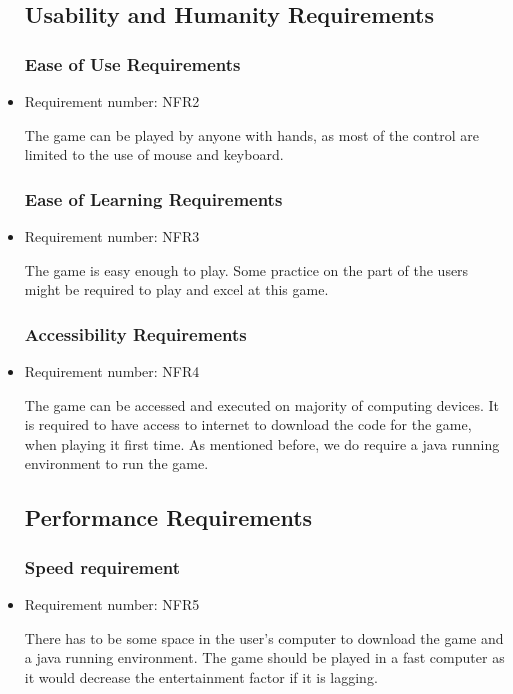 \documentclass[12pt,letterpaper]{article}
\begin{document}
\begin{itemize}
	\subsection{Usability and Humanity Requirements}
	\subsubsection{Ease of Use Requirements}
	
	\item Requirement number: NFR2
	
   	The game can be played by anyone with hands, as most of the control are limited to the use of mouse and keyboard.
 	\subsubsection{Ease of Learning Requirements}
 	
 	\item Requirement number: NFR3
 	
   	The game is easy enough to play. Some practice on the part of the users might be required to play and excel at this game.
 	\subsubsection{Accessibility Requirements}
 	
 	\item Requirement number: NFR4
 	
	The game can be accessed and executed on majority of computing devices. It is required to have access to internet to download the code for the game, when playing it first time. As mentioned before, we do require a java running environment to run the game.

\subsection{Performance Requirements}
\subsubsection{Speed requirement}

\item Requirement number: NFR5

   	There has to be some space in the user’s computer to download the game and a java running environment. The game should be played in a fast computer as it would decrease the entertainment factor if it is lagging.

\end{itemize}
\end{document}
